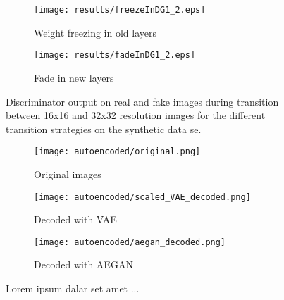 \begin{figure}[t]
    \centering
    \begin{subfigure}[b]{0.49\textwidth}
        \texttt{[image: results/freezeInDG1\_2.eps]}
        \caption{Weight freezing in old layers}
        \label{fig:freezeInDG1}
    \end{subfigure}
    \begin{subfigure}[b]{0.49\textwidth}
        \texttt{[image: results/fadeInDG1\_2.eps]}
        \caption{Fade in new layers}
        \label{fig:freezeInDG2}
    \end{subfigure}
    \caption{Discriminator output on real and fake images during transition between 16x16 and 32x32 resolution images for the different transition strategies on the synthetic data se.}
    \label{fig:fadeVsFreeze}
\end{figure}

\begin{figure}[t]
    \centering
    \begin{subfigure}[b]{\textwidth}
        \texttt{[image: autoencoded/original.png]}
        \caption{Original images}
        \label{fig:stuff}
    \end{subfigure}
    \begin{subfigure}[b]{\textwidth}
        \texttt{[image: autoencoded/scaled\_VAE\_decoded.png]}
        \caption{Decoded with VAE}
        \label{fig:stuff}
    \end{subfigure}
    \begin{subfigure}[b]{\textwidth}
        \texttt{[image: autoencoded/aegan\_decoded.png]}
        \caption{Decoded with AEGAN}
        \label{fig:stuff}
    \end{subfigure}
    \caption{Lorem ipsum dalar set amet ...}
    \label{fig:autoencoders}
\end{figure}

